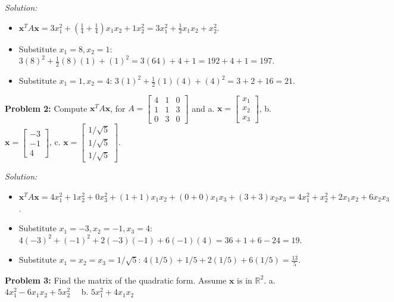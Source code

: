\documentclass[11pt, letterpaper]{article}
\theoremstyle{definition}
\theoremstyle{remark}
\newcommand{\R}{\mathbb{R}}
\newcommand{\x}{\mathbf{x}}
\begin{document}
\textit{Solution:}
\begin{itemize}
    \item[\textbf{a.}] $\x^T A \x = 3x_1^2 + \left(\frac{1}{4} + \frac{1}{4}\right)x_1 x_2 + 1x_2^2 = 3x_1^2 + \frac{1}{2}x_1 x_2 + x_2^2$.
    \item[\textbf{b.}] Substitute $x_1 = 8, x_2 = 1$: $3(8)^2 + \frac{1}{2}(8)(1) + (1)^2 = 3(64) + 4 + 1 = 192 + 4 + 1 = 197$.
    \item[\textbf{c.}] Substitute $x_1 = 1, x_2 = 4$: $3(1)^2 + \frac{1}{2}(1)(4) + (4)^2 = 3 + 2 + 16 = 21$.
\end{itemize}

\textbf{Problem 2:} Compute $\x^T A \x$, for $A = \begin{bmatrix} 4 & 1 & 0 \\ 1 & 1 & 3 \\ 0 & 3 & 0 \end{bmatrix}$ and 
a. $\x = \begin{bmatrix} x_1 \\ x_2 \\ x_3 \end{bmatrix}$, b. $\x = \begin{bmatrix} -3 \\ -1 \\ 4 \end{bmatrix}$, c. $\x = \begin{bmatrix} 1/\sqrt{5} \\ 1/\sqrt{5} \\ 1/\sqrt{5} \end{bmatrix}$.

\textit{Solution:}
\begin{itemize}
    \item[\textbf{a.}] $\x^T A \x = 4x_1^2 + 1x_2^2 + 0x_3^2 + (1+1)x_1 x_2 + (0+0)x_1 x_3 + (3+3)x_2 x_3 = 4x_1^2 + x_2^2 + 2x_1 x_2 + 6x_2 x_3$.
    \item[\textbf{b.}] Substitute $x_1 = -3, x_2 = -1, x_3 = 4$: $4(-3)^2 + (-1)^2 + 2(-3)(-1) + 6(-1)(4) = 36 + 1 + 6 - 24 = 19$.
    \item[\textbf{c.}] Substitute $x_1 = x_2 = x_3 = 1/\sqrt{5}$: $4(1/5) + 1/5 + 2(1/5) + 6(1/5) = \frac{13}{5}$.
\end{itemize}

\textbf{Problem 3:} Find the matrix of the quadratic form. Assume $\x$ is in $\R^2$.
a. $4x_1^2 - 6x_1 x_2 + 5x_2^2 \quad$ b. $5x_1^2 + 4x_1 x_2$
\end{document}
